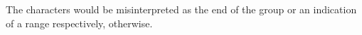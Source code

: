 The characters would be misinterpreted as the end of the group or an
indication of a range respectively, otherwise.
